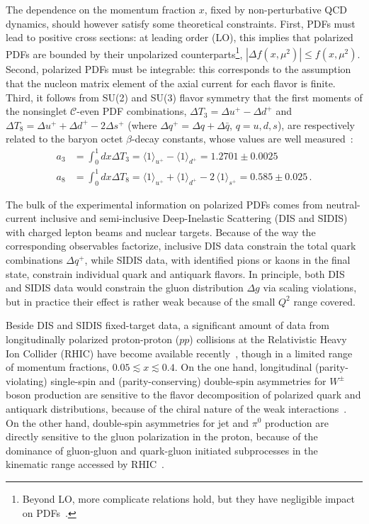 The dependence on the momentum fraction $x$, fixed by non-perturbative QCD 
dynamics, should however satisfy some theoretical constraints.
%
First, PDFs must lead to positive cross sections: 
at leading order (LO), this implies that polarized 
PDFs are bounded by their unpolarized counterparts\footnote{Beyond LO, more 
complicate relations hold, but they have negligible impact on  
PDFs~\cite{Altarelli:1998gn}.}, $|\Delta f(x,\mu^2)|\leq f(x,\mu^2)$.
%
Second, polarized PDFs must be integrable: this corresponds to the assumption 
that the nucleon matrix element of the axial current for each flavor is finite.
%
Third, it follows from SU(2) and SU(3) flavor symmetry that 
the first moments of the nonsinglet $\mathcal{C}$-even PDF combinations,
$\Delta T_3=\Delta u^+ -\Delta d^+$ and 
$\Delta T_8 = \Delta u^+ +\Delta d^+ -2\Delta s^+$ 
(where $\Delta q^+=\Delta q+\Delta\bar{q}$, $q=u,d,s$), are respectively
related to the baryon octet $\beta$-decay constants, whose values are 
well measured~\cite{Agashe:2014kda}:
\begin{align}
 a_3
 & =
 \int_0^1 dx \Delta T_3 
 = \langle 1\rangle_{u^+} - \langle 1\rangle_{d^+}  = 1.2701 \pm 0.0025\\
 a_8
 & =
 \int_0^1 dx \Delta T_8 
 = \langle 1 \rangle_{u^+} + \langle 1 \rangle_{d^+} -2\,\langle 1 \rangle_{s^+} 
 =0.585  \pm 0.025
 \,\mbox{.}
\label{eq:decayconst}
\end{align}

The bulk of the experimental information on polarized PDFs comes from 
neutral-current inclusive and semi-inclusive Deep-Inelastic Scattering 
(DIS and SIDIS) with charged lepton beams and nuclear targets. Because of the
way the corresponding observables factorize, inclusive DIS data constrain the 
total quark combinations $\Delta q^+$, 
while SIDIS data, with identified pions or kaons in the final state, 
constrain individual quark and antiquark flavors. In principle, both DIS and 
SIDIS data would constrain the gluon distribution $\Delta g$ via scaling 
violations, but in practice their effect is rather weak because of the small 
$Q^2$ range covered. 

Beside DIS and SIDIS fixed-target data, a significant amount of data from
longitudinally polarized proton-proton ($pp$) collisions at the Relativistic 
Heavy Ion Collider (RHIC) have become available 
recently~\cite{Aschenauer:2015eha}, though in a limited range of momentum 
fractions, $0.05\lesssim x \lesssim 0.4$.
%
On the one hand, longitudinal (parity-violating) single-spin and 
(parity-conserving) double-spin asymmetries for $W^\pm$ boson production are 
sensitive to the flavor decomposition of polarized quark and antiquark 
distributions, because of the chiral nature of the weak 
interactions~\cite{Bourrely:1993dd}. 
%
On the other hand, double-spin asymmetries for jet and $\pi^0$ 
production are directly sensitive to the gluon polarization in 
the proton, because of the dominance of gluon-gluon and quark-gluon initiated 
subprocesses in the kinematic range accessed by RHIC~\cite{Bourrely:1990pz}.

